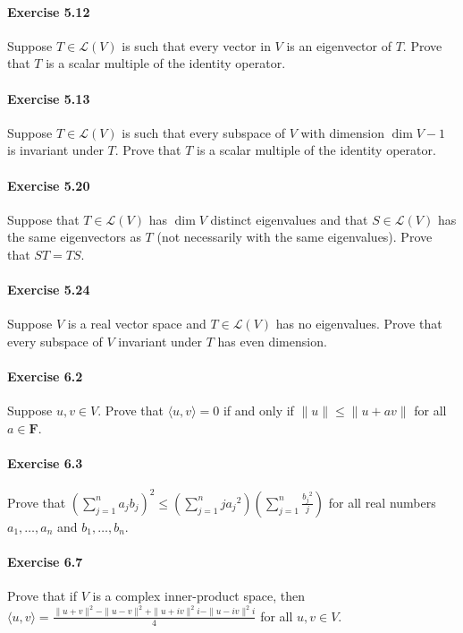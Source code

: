 \documentclass{article}
\theoremstyle{definition}
\begin{document}
\paragraph{Exercise 5.12} Suppose $T \in \mathcal{L}(V)$ is such that every vector in $V$ is an eigenvector of $T$. Prove that $T$ is a scalar multiple of the identity operator.

\paragraph{Exercise 5.13} Suppose $T \in \mathcal{L}(V)$ is such that every subspace of $V$ with dimension $\operatorname{dim} V-1$ is invariant under $T$. Prove that $T$ is a scalar multiple of the identity operator.

\paragraph{Exercise 5.20} Suppose that $T \in \mathcal{L}(V)$ has $\operatorname{dim} V$ distinct eigenvalues and that $S \in \mathcal{L}(V)$ has the same eigenvectors as $T$ (not necessarily with the same eigenvalues). Prove that $S T=T S$.

\paragraph{Exercise 5.24} Suppose $V$ is a real vector space and $T \in \mathcal{L}(V)$ has no eigenvalues. Prove that every subspace of $V$ invariant under $T$ has even dimension.

\paragraph{Exercise 6.2} Suppose $u, v \in V$. Prove that $\langle u, v\rangle=0$ if and only if $\|u\| \leq\|u+a v\|$ for all $a \in \mathbf{F}$.

\paragraph{Exercise 6.3} Prove that $\left(\sum_{j=1}^{n} a_{j} b_{j}\right)^{2} \leq\left(\sum_{j=1}^{n} j a_{j}{ }^{2}\right)\left(\sum_{j=1}^{n} \frac{b_{j}{ }^{2}}{j}\right)$ for all real numbers $a_{1}, \ldots, a_{n}$ and $b_{1}, \ldots, b_{n}$.

\paragraph{Exercise 6.7} Prove that if $V$ is a complex inner-product space, then $\langle u, v\rangle=\frac{\|u+v\|^{2}-\|u-v\|^{2}+\|u+i v\|^{2} i-\|u-i v\|^{2} i}{4}$ for all $u, v \in V$.
\end{document}
